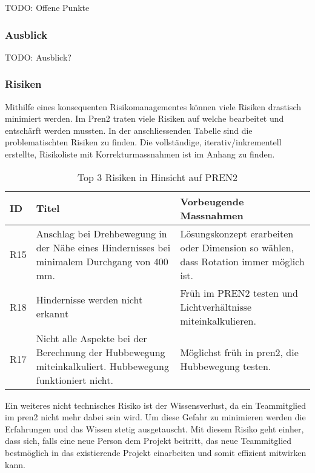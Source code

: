 TODO: Offene Punkte

\newpage

\subsubsection{Ausblick}

TODO: Ausblick?


\subsubsection{Risiken}
Mithilfe eines konsequenten Risikomanagementes können viele Risiken drastisch minimiert werden. Im Pren2 traten viele Risiken auf welche bearbeitet und entschärft werden mussten. In der anschliessenden Tabelle sind die problematischten Risiken zu finden. Die vollständige, iterativ/inkrementell erstellte, Risikoliste mit Korrekturmassnahmen ist im Anhang zu finden.

\begin{center}
\begin{table}[H]
    \begin{tabularx}{\textwidth}{|l|X|X|}
        \hline
        \textbf{ID} & \textbf{Titel} & \textbf{Vorbeugende Massnahmen} \\ \hline
        R15 & Anschlag bei Drehbewegung in der Nähe eines Hindernisses bei minimalem Durchgang von 400 mm. & Lösungskonzept erarbeiten oder Dimension so wählen, dass Rotation immer möglich ist. \\ \hline
        R18 & Hindernisse werden nicht erkannt & Früh im PREN2 testen und Lichtverhältnisse miteinkalkulieren. \\ \hline
        R17 & Nicht alle Aspekte bei der Berechnung der Hubbewegung miteinkalkuliert. Hubbewegung funktioniert nicht. & Möglichst früh in \acrshort{pren2}, die Hubbewegung testen.\\ \hline
    \end{tabularx}
    \caption{Top 3 Risiken in Hinsicht auf PREN2}
    \label{tab:risikomanagement-ausblick}
\end{table}
\end{center}

Ein weiteres nicht technisches Risiko ist der Wissensverlust, da ein Teammitglied im \acrshort{pren2} nicht mehr dabei sein wird. Um diese Gefahr zu minimieren werden die Erfahrungen und das Wissen stetig ausgetauscht. Mit diesem Risiko geht einher, dass sich, falls eine neue Person dem Projekt beitritt, das neue Teammitglied bestmöglich in das existierende Projekt einarbeiten und somit effizient mitwirken kann.












